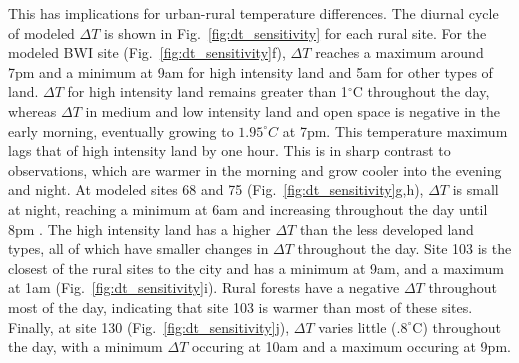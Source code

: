 \documentclass[draft,linenumbers]{agujournal}
\begin{document}
 This has implications for urban-rural temperature differences. The diurnal cycle of modeled $\Delta T$ is shown in Fig.~\ref{fig:dt_sensitivity} for each rural site. 
 For the modeled BWI site (Fig.~\ref{fig:dt_sensitivity}f), $\Delta T$ reaches a maximum around 7pm and a minimum at 9am for high intensity land and 5am for other types of land. $\Delta T$ for high intensity land remains greater than 1$^\circ$C throughout the day, whereas $\Delta T$ in medium and low intensity land and open space is negative in the early morning, eventually growing to $1.95^\circ C$ at 7pm. This temperature maximum lags that of high intensity land by one hour. This is in sharp contrast to observations, which are warmer in the morning and grow cooler into the evening and night. 
 At modeled sites 68 and 75 (Fig.~\ref{fig:dt_sensitivity}g,h), $\Delta T$ is small at night, reaching a minimum at 6am and increasing throughout the day until 8pm . The high intensity land has a higher $\Delta T$ than the less developed land types, all of which have smaller changes in $\Delta T$ throughout the day. 
Site 103 is the closest of the rural sites to the city  and has a minimum at 9am, and a maximum at 1am (Fig.~\ref{fig:dt_sensitivity}i). 
Rural forests have a negative $\Delta T$ throughout most of the day, indicating that site 103 is warmer than most of these sites. 
Finally, at site 130 (Fig.~\ref{fig:dt_sensitivity}j), $\Delta T$ varies little ($.8^\circ $C) throughout the day, with a minimum $\Delta T$ occuring at 10am and a maximum occuring at 9pm. 
\end{document}
